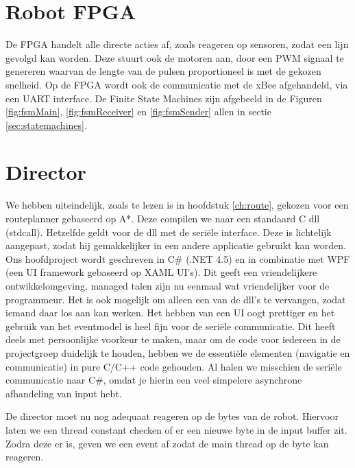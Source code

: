 \documentclass{report}
\begin{document}
\section{Robot FPGA}
De FPGA handelt alle directe acties af, zoals reageren op sensoren, zodat een lijn gevolgd kan worden.
Deze stuurt ook de motoren aan, door een PWM signaal te genereren waarvan de lengte van de pulsen proportioneel is met de gekozen snelheid.
Op de FPGA wordt ook de communicatie met de xBee afgehandeld, via een UART interface.
De Finite State Machines zijn afgebeeld in de Figuren \ref{fig:fsmMain}, \ref{fig:fsmReceiver} en \ref{fig:fsmSender} allen in sectie \ref{sec:statemachines}.

\section{Director}
We hebben uiteindelijk, zoals te lezen is in hoofdstuk \ref{ch:route}, gekozen voor een routeplanner gebaseerd op A*. Deze compilen we naar een standaard C dll (stdcall).
Hetzelfde geldt voor de dll met de seriële interface. Deze is lichtelijk aangepast, zodat hij gemakkelijker in een andere applicatie gebruikt kan worden.
Ons hoofdproject wordt geschreven in C\# (.NET 4.5) en in combinatie met WPF (een UI framework gebaseerd op XAML UI's).
Dit geeft een vriendelijkere ontwikkelomgeving, managed talen zijn nu eenmaal wat vriendelijker voor de programmeur.
Het is ook mogelijk om alleen een van de dll's te vervangen, zodat iemand daar los aan kan werken.
Het hebben van een UI oogt prettiger en het gebruik van het eventmodel is heel fijn voor de seriële communicatie.
Dit heeft deels met persoonlijke voorkeur te maken, maar om de code voor iedereen in de projectgroep duidelijk te houden, hebben we de essentiële elementen (navigatie en communicatie) in pure C/C++ code gehouden. Al halen we misschien de seriële communicatie naar C\#, omdat je hierin een veel simpelere asynchrone afhandeling van input hebt.

De director moet nu nog adequaat reageren op de bytes van de robot.
Hiervoor laten we een thread constant checken of er een nieuwe byte in de input buffer zit. Zodra deze er is, geven we een event af zodat de main thread op de byte kan reageren.
\end{document}
